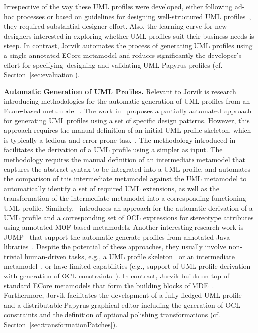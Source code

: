 Irrespective of the way these UML profiles were developed, either 
following ad-hoc processes or based on guidelines for designing well-structured 
UML profiles~\cite{FuentesFernandez2004:UMLME,Selic2007:ISORC},
they required substantial designer effort. Also, the learning 
curve for new designers interested in exploring whether UML profiles suit their 
business needs is steep.
In contrast, Jorvik automates the process of generating UML profiles using a single annotated ECore metamodel and reduces significantly the developer's effort for specifying, designing and validating UML Papyrus profiles (cf. Section~\ref{sec:evaluation}).

\textbf{Automatic Generation of UML Profiles.}
Relevant to Jorvik is research introducing methodologies for the automatic 
generation of UML profiles from an Ecore-based metamodel~\cite{Kraas17}. 
The work in~\cite{Lagarde2008:FASE} proposes a partially automated approach for 
generating UML profiles using a set of specific design patterns. However, this 
approach requires the manual definition of an initial UML profile skeleton, 
which is typically a tedious and error-prone task~\cite{Wimmer2009:IJWIS}. 
The methodology introduced in~\cite{Giachetti2008:ER,Giachetti2009:CAISE} 
facilitates the derivation of a UML profile using a simpler as input. 
The methodology requires the manual definition of an intermediate metamodel 
that captures the abstract syntax to be integrated into a UML profile, and 
automates the comparison of this intermediate metamodel against the UML 
metamodel to automatically identify a set of required UML extensions, as well 
as the transformation of the intermediate metamodel into a corresponding 
functioning UML profile. 
Similarly,~\cite{Kraas17} introduces an approach for the automatic derivation of a UML profile and a corresponding set of OCL expressions
for stereotype attributes using annotated MOF-based metamodels.
Another interesting research work is JUMP~\cite{Bergmayr2014:MODELS} that support the automatic generate profiles from annotated Java libraries~\cite{Bergmayr2014:MODELS}.
Despite the potential of these approaches, they usually involve
non-trivial human-driven tasks, e.g., a UML profile 
skeleton~\cite{Lagarde2008:FASE} or an intermediate 
metamodel~\cite{Giachetti2008:ER,Giachetti2009:CAISE}, or have limited capabilities (e.g., support of UML profile derivation with generation of OCL constraints~\cite{Kraas17}). In contrast, Jorvik builds on top of standard ECore metamodels that form the building blocks of MDE~\cite{omg2014meta}. 
Furthermore, Jorvik facilitates the development of a fully-fledged UML profile and a distributable Papyrus graphical editor including the generation of OCL constraints and the definition of optional polishing transformations (cf. 
Section~\ref{sec:transformationPatches}).


